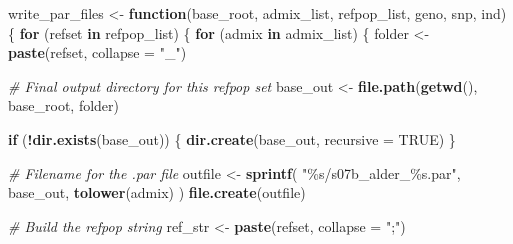 \documentclass[
]{article}
\newenvironment{Shaded}{\begin{snugshade}}{\end{snugshade}}
\newcommand{\AttributeTok}[1]{\textcolor[rgb]{0.13,0.29,0.53}{#1}}
\newcommand{\CommentTok}[1]{\textcolor[rgb]{0.56,0.35,0.01}{\textit{#1}}}
\newcommand{\ConstantTok}[1]{\textcolor[rgb]{0.56,0.35,0.01}{#1}}
\newcommand{\ControlFlowTok}[1]{\textcolor[rgb]{0.13,0.29,0.53}{\textbf{#1}}}
\newcommand{\FunctionTok}[1]{\textcolor[rgb]{0.13,0.29,0.53}{\textbf{#1}}}
\newcommand{\NormalTok}[1]{#1}
\newcommand{\OtherTok}[1]{\textcolor[rgb]{0.56,0.35,0.01}{#1}}
\newcommand{\SpecialCharTok}[1]{\textcolor[rgb]{0.81,0.36,0.00}{\textbf{#1}}}
\newcommand{\StringTok}[1]{\textcolor[rgb]{0.31,0.60,0.02}{#1}}
\begin{document}
\begin{Shaded}
\begin{Highlighting}[]
\NormalTok{write\_par\_files }\OtherTok{\textless{}{-}} \ControlFlowTok{function}\NormalTok{(base\_root,}
\NormalTok{                            admix\_list,}
\NormalTok{                            refpop\_list,}
\NormalTok{                            geno,}
\NormalTok{                            snp,}
\NormalTok{                            ind) \{}
  \ControlFlowTok{for}\NormalTok{ (refset }\ControlFlowTok{in}\NormalTok{ refpop\_list) \{}
    \ControlFlowTok{for}\NormalTok{ (admix }\ControlFlowTok{in}\NormalTok{ admix\_list) \{}
\NormalTok{      folder }\OtherTok{\textless{}{-}} \FunctionTok{paste}\NormalTok{(refset, }\AttributeTok{collapse =} \StringTok{"\_"}\NormalTok{)}

      \CommentTok{\# Final output directory for this refpop set}
\NormalTok{      base\_out }\OtherTok{\textless{}{-}} \FunctionTok{file.path}\NormalTok{(}\FunctionTok{getwd}\NormalTok{(), base\_root, folder)}

      \ControlFlowTok{if}\NormalTok{ (}\SpecialCharTok{!}\FunctionTok{dir.exists}\NormalTok{(base\_out)) \{}
        \FunctionTok{dir.create}\NormalTok{(base\_out, }\AttributeTok{recursive =} \ConstantTok{TRUE}\NormalTok{)}
\NormalTok{      \}}

      \CommentTok{\# Filename for the .par file}
\NormalTok{      outfile }\OtherTok{\textless{}{-}} \FunctionTok{sprintf}\NormalTok{(}
        \StringTok{"\%s/s07b\_alder\_\%s.par"}\NormalTok{,}
\NormalTok{        base\_out, }\FunctionTok{tolower}\NormalTok{(admix)}
\NormalTok{      )}
      \FunctionTok{file.create}\NormalTok{(outfile)}

      \CommentTok{\# Build the refpop string}
\NormalTok{      ref\_str }\OtherTok{\textless{}{-}} \FunctionTok{paste}\NormalTok{(refset, }\AttributeTok{collapse =} \StringTok{";"}\NormalTok{)}


\end{Highlighting}
\end{Shaded}
\end{document}
